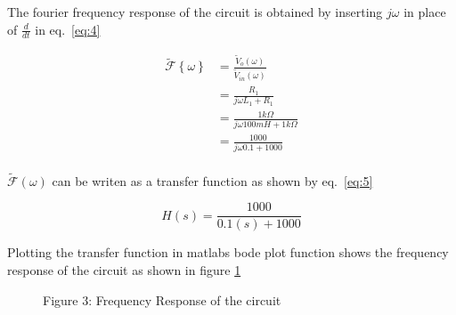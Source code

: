 The fourier frequency response of the circuit is obtained by inserting $j\omega$ in place of $\frac{d}{dt}$ in eq.~\ref{eq:4}

\begin{equation}
    \begin{split}
        \widetilde{\mathcal{F}} \left\{\omega\right\} &= \frac{\widetilde{V}_o\left(\omega\right)}{\widetilde{V}_{in}\left(\omega\right)}\\
          &= \frac{R_{1}}{j\omega L_{1}+R_{1}} \\
          &= \frac{1k\Omega}{j\omega 100mH+1k\Omega} \\
          &= \frac{1000}{j\omega 0.1 + 1000} \\
    \end{split}\label{eq:4}
\end{equation}

$\widetilde{\mathcal{F}}\left(\omega\right)$ can be writen as a transfer function as shown by eq.~\ref{eq:5}

\begin{equation}
    H\left(s\right) = \frac{1000}{0.1\left(s\right) + 1000}
    \label{eq:5}
\end{equation}

Plotting the transfer function in matlabs bode plot function shows the frequency response of the circuit as shown in figure \ref{fig:3}

\begin{figure}[ht!]
\centering
    
    
\caption{Figure 3: Frequency Response of the circuit}\label{fig:3}
\end{figure}\FloatBarrier


